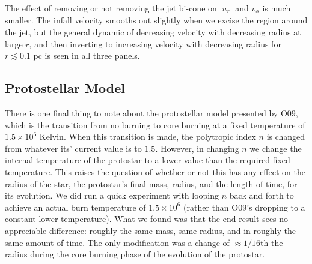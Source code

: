 \documentclass[../dissertation.tex]{subfiles}
\begin{document}
The effect of removing or not removing the jet bi-cone on $|u_r|$ and $v_\phi$ is much smaller.
The infall velocity smooths out slightly when we excise the region around the jet, but the general dynamic of decreasing velocity with decreasing radius at large $r$, and then inverting to increasing velocity with decreasing radius for $r\lesssim 0.1$ pc is seen in all three panels.

%

\subsection{Protostellar Model}
\label{appendix:jet_protostar}
There is one final thing to note about the protostellar model presented by O09, which is the transition from no burning to core burning at a fixed temperature of $1.5 \times 10^6$ Kelvin.
When this transition is made, the polytropic index $n$ is changed from whatever its' current value is to $1.5$.
However, in changing $n$ we change the internal temperature of the protostar to a lower value than the required fixed temperature.
This raises the question of whether or not this has any effect on the radius of the star, the protostar's final mass, radius, and the length of time, for its evolution.
We did run a quick experiment with looping $n$ back and forth to achieve an actual burn temperature of $1.5 \times 10^6$ (rather than O09's dropping to a constant lower temperature).
What we found was that the end result sees no appreciable difference: roughly the same mass, same radius, and in roughly the same amount of time. The only modification was a change of $\approx 1/16 $th the radius during the core burning phase of the evolution of the protostar.

\end{document}
